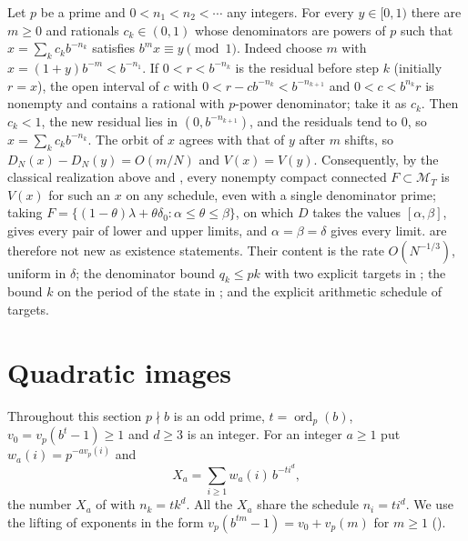 \documentclass[11pt]{article}
\newcommand{\Minv}{\mathcal M_T}
\DeclareMathOperator{\ord}{ord}
\begin{document}
\begin{remark}\label{rem:qualitative}
Let $p$ be a prime and $0<n_1<n_2<\cdots$ any integers. For every $y\in[0,1)$ there are $m\ge0$ and
rationals $c_k\in(0,1)$ whose denominators are powers of $p$ such that
$x=\sum_kc_kb^{-n_k}$ satisfies $b^mx\equiv y\pmod1$. Indeed choose $m$ with
$x=(1+y)b^{-m}<b^{-n_1}$. If $0<r<b^{-n_k}$ is the residual before step $k$ (initially $r=x$), the
open interval of $c$ with $0<r-cb^{-n_k}<b^{-n_{k+1}}$ and $0<c<b^{n_k}r$ is nonempty and contains a
rational with $p$-power denominator; take it as $c_k$. Then $c_k<1$, the new residual lies in
$(0,b^{-n_{k+1}})$, and the residuals tend to $0$, so $x=\sum_kc_kb^{-n_k}$. The orbit of $x$ agrees
with that of $y$ after $m$ shifts, so $D_N(x)-D_N(y)=O(m/N)$ and $V(x)=V(y)$. Consequently, by the
classical realization above and , every nonempty compact connected $F\subset\Minv$ is
$V(x)$ for such an $x$ on any schedule, even with a single denominator prime; taking
$F=\{(1-\theta)\lambda+\theta\delta_0:\alpha\le\theta\le\beta\}$, on which $D$ takes the values
$[\alpha,\beta]$, gives every pair of lower and upper limits, and $\alpha=\beta=\delta$ gives every limit.
 are therefore not new as existence statements. Their content
is the rate $O(N^{-1/3})$, uniform in $\delta$; the denominator bound $q_k\le pk$ with two explicit
targets in ; the bound $k$ on the period of the state in
; and the explicit arithmetic schedule of targets.
\end{remark}

\section{Quadratic images}\label{sec:quadratic}

Throughout this section $p\nmid b$ is an odd prime, $t=\ord_p(b)$, $v_0=v_p(b^t-1)\ge1$ and $d\ge3$ is an integer.
For an integer $a\ge1$ put $w_a(i)=p^{-av_p(i)}$ and
\[
X_a=\sum_{i\ge1}w_a(i)\,b^{-ti^d},
\]
the number $X_a$ of  with $n_k=tk^d$. All the $X_a$ share the schedule $n_i=ti^d$. We
use the lifting of exponents in the form $v_p(b^{tm}-1)=v_0+v_p(m)$ for $m\ge1$ ().
\end{document}
